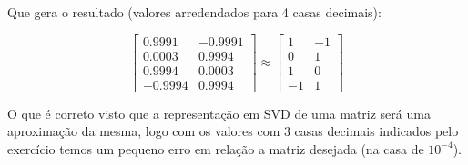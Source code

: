 \documentclass[11pt]{article}
\begin{document}
\begin{exerc}
\begin{enumerate}
Que gera o resultado (valores arredendados para 4 casas decimais):

\[
\begin{bmatrix}
    0.9991 & -0.9991 \\
    0.0003 & 0.9994 \\
    0.9994 & 0.0003 \\
    -0.9994 & 0.9994
\end{bmatrix}
\approx
\begin{bmatrix}
    1 & -1 \\
    0 & 1 \\
    1 & 0 \\
    -1 & 1
\end{bmatrix}
\]

O que é correto visto que a representação em SVD de uma matriz será uma aproximação da mesma, logo com os valores com 3 casas decimais indicados pelo exercício temos um pequeno erro em relação a matriz desejada (na casa de $10^{-4}$).

\end{enumerate}
\end{exerc}
\end{document}
